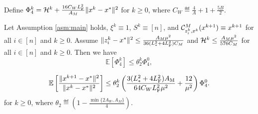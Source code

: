 \documentclass[11pt]{article}
\begin{document}
	
	
	
	
	Define $\Phi_4^{k} = {\cal H}^k+ \frac{16C_WL_{\rm F}^2}{A_M} \|x^k-x^*\|^2$ for $k\geq 0$, where $C_W \eqdef \frac{4}{A} + 1 + \frac{5B}{2}$. 
	
	\begin{theorem}\label{th:supl-3PCBL2}
		Let Assumption \ref{asm:main} holds, $\xi^k \equiv 1$, $S^k\equiv [n]$, and ${\mathcal{C}}_{z_i^k, x^k}^M (x^{k+1}) \equiv x^{k+1}$ for all $i\in[n]$ and $k\geq 0$. Assume $\|z_i^k-x^*\|^2 \leq \frac{A_M \mu^2}{36(L_{*}^2 + 4L_{\rm F}^2)C_M}$ and ${\cal H}^k \leq \frac{A_M\mu^2}{576C_M}$ for all $i\in [n]$ and $k\geq 0$. Then we have 
		$$
		\mathbb{E}[\Phi_4^k] \leq \theta_2^k \Phi_4^0, 
		$$
		
		$$
		\mathbb{E} \left[   \frac{\|x^{k+1}-x^*\|^2}{\|x^k-x^*\|^2} \right]  \leq \theta_2^k \left( \frac{3(L_{*}^2+4L_{\rm F}^2)A_{\rm M}}{64C_WL_{\rm F}^2\mu^2} + \frac{12}{\mu^2}  \right) \Phi_4^0. 
		$$
		for $k\geq 0$, where $\theta_2 \eqdef \left(  1 - \frac{\min\{  2A_W, A_M  \}}{4}  \right)$. 
	\end{theorem}
	
\end{document}
